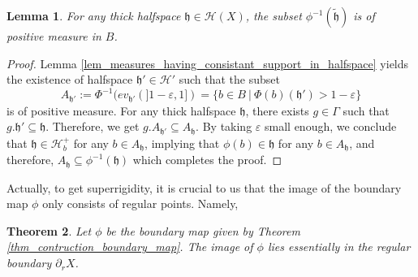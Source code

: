 \documentclass{amsart}
\numberwithin{equation}{section}
\newtheorem{thm}{Theorem}[section]
\newtheorem{lem}[thm]{Lemma}
\newcommand{\HH}{\mathcal{H}}     %
\newcommand{\hh}{\mathfrak{h}}    %
\theoremstyle{definition}
\begin{document}
\begin{lem}\label{lem_inverse_image_halfspace_positive_measure}
   For any thick halfspace $\hh\in\HH(X)$, the subset $\phi^{-1}(\tilde{\hh})$ is of positive measure in $B$.
    \end{lem}
    \begin{proof}
   Lemma \ref{lem_measures_having_consistant_support_in_halfspace} yields the existence of halfspace $\hh'\in\HH'$ such that the subset 
   \[
   A_{\hh'}:=\Phi^{-1}(ev_{\hh'}(]1-\varepsilon,1])=\{b\in B\ |\ \Phi(b)(\hh')>1-\varepsilon\}
   \]
   is of positive measure. For any thick halfspace $\hh$, there exists $g\in\Gamma$ such that $g.\hh'\subseteq \hh$. Therefore, we get $g.A_{\hh'}\subseteq A_\hh$. By taking $\varepsilon$ small enough, we conclude that $\hh\in\HH_b^+$ for any $b\in A_\hh$, implying that $\phi(b)\in \hh$ for any $b\in A_\hh$, and therefore, $A_\hh\subseteq \phi^{-1}(\hh)$ which completes the proof.
    \end{proof}
    Actually, to get superrigidity, it is crucial to us that the image of the boundary map $\phi$ only consists of regular points. Namely, 
\begin{thm}\label{thm_image_in_regular_boundary}
Let $\phi$ be the boundary map given by Theorem \ref{thm_contruction_boundary_map}. The image of $\phi$ lies essentially in the regular boundary $\partial_r X$.
\end{thm}
\end{document}
